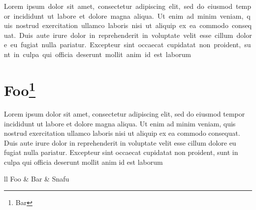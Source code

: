 \documentclass{article}
\begin{document}
  \begin{center}
    \hbox{Lorem ipsum dolor sit amet, consectetur adipiscing elit, sed do eiusmod tempor incididunt ut labore et dolore magna aliqua. Ut enim ad minim
    veniam, quis nostrud exercitation ullamco laboris nisi ut aliquip ex ea commodo consequat. Duis aute irure dolor in reprehenderit in voluptate
    velit esse cillum dolore eu fugiat nulla pariatur. Excepteur sint occaecat cupidatat non proident, sunt in culpa qui officia deserunt mollit anim
    id est laborum} \\
  \end{center}

  \section{Foo\footnote{Bar}}

  Lorem ipsum dolor sit amet, consectetur adipiscing elit, sed do eiusmod tempor incididunt ut labore et dolore magna aliqua. Ut enim ad minim
  veniam, quis nostrud exercitation ullamco laboris nisi ut aliquip ex ea commodo consequat. Duis aute irure dolor in reprehenderit in voluptate
  velit esse cillum dolore eu fugiat nulla pariatur. Excepteur sint occaecat cupidatat non proident, sunt in culpa qui officia deserunt mollit anim
  id est laborum

  \begin{tabular}{ll}
    Foo & Bar & Snafu \\
  \end{tabular}

  

  
\end{document}

